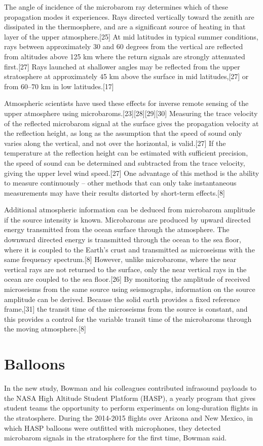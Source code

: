 \documentclass[10pt,a4paper]{article}
\begin{document}
The angle of incidence of the microbarom ray determines which of these propagation modes it experiences. Rays directed vertically toward the zenith are dissipated in the thermosphere, and are a significant source of heating in that layer of the upper atmosphere.[25] At mid latitudes in typical summer conditions, rays between approximately 30 and 60 degrees from the vertical are reflected from altitudes above 125 km where the return signals are strongly attenuated first.[27] Rays launched at shallower angles may be reflected from the upper stratosphere at approximately 45 km above the surface in mid latitudes,[27] or from 60–70 km in low latitudes.[17]

Atmospheric scientists have used these effects for inverse remote sensing of the upper atmosphere using microbaroms.[23][28][29][30] Measuring the trace velocity of the reflected microbarom signal at the surface gives the propagation velocity at the reflection height, as long as the assumption that the speed of sound only varies along the vertical, and not over the horizontal, is valid.[27] If the temperature at the reflection height can be estimated with sufficient precision, the speed of sound can be determined and subtracted from the trace velocity, giving the upper level wind speed.[27] One advantage of this method is the ability to measure continuously – other methods that can only take instantaneous measurements may have their results distorted by short-term effects.[8]

Additional atmospheric information can be deduced from microbarom amplitude if the source intensity is known. Microbaroms are produced by upward directed energy transmitted from the ocean surface through the atmosphere. The downward directed energy is transmitted through the ocean to the sea floor, where it is coupled to the Earth's crust and transmitted as microseisms with the same frequency spectrum.[8] However, unlike microbaroms, where the near vertical rays are not returned to the surface, only the near vertical rays in the ocean are coupled to the sea floor.[26] By monitoring the amplitude of received microseisms from the same source using seismographs, information on the source amplitude can be derived. Because the solid earth provides a fixed reference frame,[31] the transit time of the microseisms from the source is constant, and this provides a control for the variable transit time of the microbaroms through the moving atmosphere.[8] 

\section{Balloons}
In the new study, Bowman and his colleagues contributed infrasound payloads to the NASA High Altitude Student Platform (HASP), a yearly program that gives student teams the opportunity to perform experiments on long-duration flights in the stratosphere. During the 2014-2015 flights over Arizona and New Mexico, in which HASP balloons were outfitted with microphones, they detected microbarom signals in the stratosphere for the first time, Bowman said.
\end{document}
